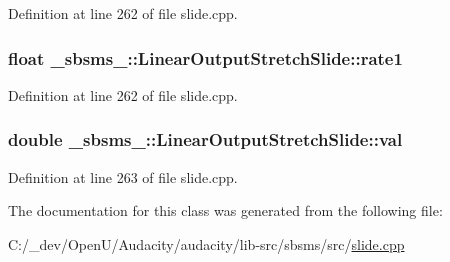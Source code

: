 Definition at line 262 of file slide.\+cpp.

\subsubsection[{\texorpdfstring{rate1}{rate1}}]{\setlength{\rightskip}{0pt plus 5cm}float \+\_\+sbsms\+\_\+\+::\+Linear\+Output\+Stretch\+Slide\+::rate1\hspace{0.3cm}{\ttfamily [protected]}}\hypertarget{class__sbsms___1_1_linear_output_stretch_slide_ad8c0f2f2b8ee323a14e4b768a033362c}{}\label{class__sbsms___1_1_linear_output_stretch_slide_ad8c0f2f2b8ee323a14e4b768a033362c}


Definition at line 262 of file slide.\+cpp.

\subsubsection[{\texorpdfstring{val}{val}}]{\setlength{\rightskip}{0pt plus 5cm}double \+\_\+sbsms\+\_\+\+::\+Linear\+Output\+Stretch\+Slide\+::val\hspace{0.3cm}{\ttfamily [protected]}}\hypertarget{class__sbsms___1_1_linear_output_stretch_slide_afd6d231c0ee50160095424d2d46f262c}{}\label{class__sbsms___1_1_linear_output_stretch_slide_afd6d231c0ee50160095424d2d46f262c}


Definition at line 263 of file slide.\+cpp.



The documentation for this class was generated from the following file\+:\begin{DoxyCompactItemize}
\item 
C\+:/\+\_\+dev/\+Open\+U/\+Audacity/audacity/lib-\/src/sbsms/src/\hyperlink{slide_8cpp}{slide.\+cpp}\end{DoxyCompactItemize}
